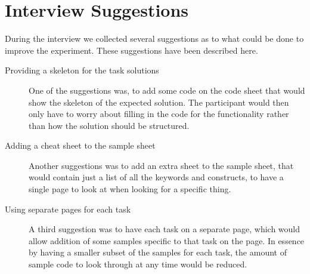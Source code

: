 \section{Interview Suggestions}
During the interview we collected several suggestions as to what could be done to improve the experiment.
These suggestions have been described here.

\begin{description}
\item[Providing a skeleton for the task solutions] One of the suggestions was, to add some code on the code sheet that would show the skeleton of the expected solution. The participant would then only have to worry about filling in the code for the functionality rather than how the solution should be structured.
\item[Adding a cheat sheet to the sample sheet] Another suggestions was to add an extra sheet to the sample sheet, that would contain just a list of all the keywords and constructs, to have a single page to look at when looking for a specific thing.
\item[Using separate pages for each task] A third suggestion was to have each task on a separate page, which would allow addition of some samples specific to that task on the page. In essence by having a smaller subset of the samples for each task, the amount of sample code to look through at any time would be reduced.
\end{description}